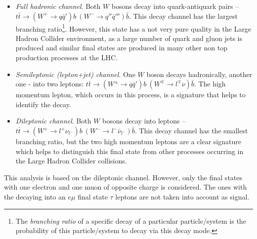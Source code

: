 \begin{itemize}
 \item \textit{Full hadronic channel}. Both $W$ bosons decay into quark-antiquark pairs -- $t\bar{t} \rightarrow (W^{+} \rightarrow q\bar{q}')b\:(W^{-} \rightarrow q''\bar{q}''')\bar{b}$.
 This decay channel has the largest branching ratio\footnote{The \textit{branching ratio} of a specific decay of a particular particle/system is the probability of this particle/system
 to decay via this decay mode.}. However, this state has a not very pure quality in the Large Hadron Collider environment, as a large number of quark and gluon jets is produced and similar
 final states are produced in many other non top production processes at the LHC.
 
 \item \textit{Semileptonic (lepton+jet) channel}. One $W$ boson decays hadronically, another one - into two leptons:  $t\bar{t} \rightarrow (W^{\pm} \rightarrow q\bar{q}')b \: (W^{\mp} \rightarrow l^{\mp}\nu)\bar{b}$.
 The high momentum lepton, which occurs in this process, is a signature that helps to identify the decay.
 
 \item \textit{Dileptonic channel}. Both $W$ bosons decay into leptons -- $t\bar{t} \rightarrow (W^{+} \rightarrow l^{+}\nu_{l^{-}})b \: (W^{-} \rightarrow l^{-}\bar{\nu}_{l^{-}})\bar{b}$.
 This decay channel has the smallest branching ratio, but the two high momentum leptons are a clear signature which helps to distinguish this final state from other processes
 occurring in the Large Hadron Collider collisions.
\end{itemize}

This analysis is based on the dileptonic channel. However, only the final states with one electron and one muon of opposite charge is considered. The ones with the decaying into
an $e\mu$ final state $\tau$ leptons are not taken into account as signal.


% 
